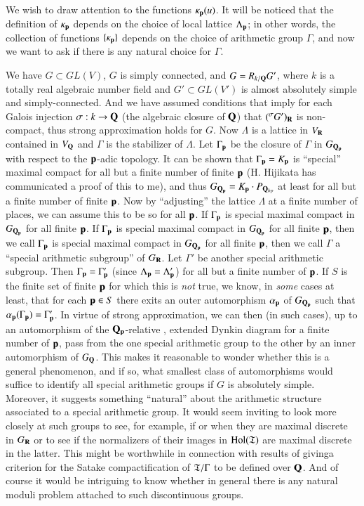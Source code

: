 We wish to draw attention to the functions $\kappa_{\mathbf{p}} (u)$. It will be noticed that the definition of $\kappa_{\mathbf{p}}$ depends on the choice of local lattice $\Lambda_{\mathbf{p}}$; in other words, the collection of functions $\{\kappa_{\mathbf{p}}\}$ depends on the choice of arithmetic group $\Gamma$, and now we want to ask if there is any natural choice for $\Gamma$.

We have $G \subset G L (V)$, $G$ is simply connected, and $G = R_{k/\mathbf{Q}} G'$, where $k$ is a totally real algebraic number field and $G' \subset G L (V')$ is almost absolutely simple and simply-connected. And we have assumed conditions that imply for each Galois injection $\sigma : k \to \mathbf{Q}$ (the algebraic closure of $\mathbf{Q}$) that $({}^{\sigma} G')_{\mathbf{R}}$ is non-compact, thus strong approximation holds for $G$. Now $\Lambda$ is a lattice in $V_{\mathbf{R}}$ contained in $V_{\mathbf{Q}}$ and $\Gamma$ is the stabilizer of $\Lambda$. Let $\Gamma_{\mathbf{p}}$ be the closure of $\Gamma$ in $G_{\mathbf{Q}_{\mathbf{p}}}$ with respect to the $\mathbf{p}$-adic topology. It can be shown that $\Gamma_{\mathbf{p}}= K_{\mathbf{p}}$ is ``special'' maximal compact \cite{art1-key5,art1-key9} for all but a finite number of finite $\mathbf{p}$ (H. Hijikata has communicated a proof of this to me), and thus $G_{\mathbf{Q}_{\mathbf{p}}} = K_{\mathbf{p}} \cdot P_{\mathbf{Q}_{bp}}$ at least for all but a finite number of finite $\mathbf{p}$. Now by ``adjusting'' the lattice $\Lambda$ at a finite number of places, we can assume this to be so for all $\mathbf{p}$. If $\Gamma_{\mathbf{p}}$ is special maximal compact in $G_{\mathbf{Q}_{\mathbf{p}}}$ for all finite $\mathbf{p}$. If $\Gamma_{\mathbf{p}}$ is special maximal compact in $G_{\mathbf{Q}_{\mathbf{p}}}$ for all finite $\mathbf{p}$, then we call $\Gamma_{\mathbf{p}}$ is special maximal compact in $G_{\mathbf{Q}_{\mathbf{p}}}$ for all finite $\mathbf{p}$, then we call $\Gamma$ a ``special arithmetic subgroup'' of $G_{\mathbf{R}}$. Let $\Gamma'$ be another special arithmetic subgroup. Then $\Gamma_{\mathbf{p}}=\Gamma'_{\mathbf{p}}$ (since $\Lambda_{\mathbf{p}} = \Lambda'_{\mathbf{p}}$) for all but a finite number of $\mathbf{p}$. If $S$ is the finite set of finite $\mathbf{p}$ for which this is {\it not} true, we know, in {\it some} cases at least, that for each $\mathbf{p} \in S$ there exits an outer automorphism $\alpha_{\mathbf{p}}$ of $G_{\mathbf{Q}_{\mathbf{p}}}$ such that $\alpha_{\mathbf{p}} (\Gamma_{\mathbf{p}}) = \Gamma'_{\mathbf{p}}$. In virtue of strong approximation, we can then (in such cases), up to an automorphism of the $\mathbf{Q}_{\mathbf{p}}$-relative , extended Dynkin diagram for a finite number of $\mathbf{p}$, pass from the one special arithmetic group to the other by an inner automorphism of $G_{\mathbf{Q}}$. This makes it reasonable to wonder whether this is a general phenomenon, and if so, what smallest class of automorphisms would suffice to identify all special arithmetic groups if $G$ is absolutely simple. Moreover, it suggests something ``natural'' about the arithmetic structure associated to a special arithmetic group. It would seem inviting to look more closely at such groups to see, for example, if or when they are maximal discrete in $G_{\mathbf{R}}$ or to see if the normalizers of their images in $\operatorname{Hol}(\mathfrak{T})$ are maximal discrete in the latter. This might be worthwhile in connection with results of \cite{art1-key1} giving\pageoriginale a criterion for the Satake compactification of $\mathfrak{T}/\Gamma$ to be defined over $\mathbf{Q}$. And of course it would be intriguing to know whether in general there is any natural moduli problem attached to such discontinuous groups.



